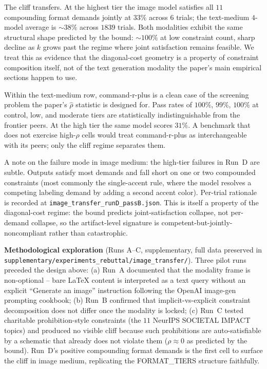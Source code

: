 \documentclass{article}
\theoremstyle{plain}
\theoremstyle{definition}
\theoremstyle{remark}
\newcommand{\rhohat}{\hat{\rho}}
\begin{document}
The cliff transfers. At the highest tier the image model satisfies all $11$ compounding format demands jointly at $33\%$ across $6$ trials; the text-medium $4$-model average is $\sim 38\%$ across $1839$ trials. Both modalities exhibit the same structural shape predicted by the bound: $\sim 100\%$ at low constraint count, sharp decline as $k$ grows past the regime where joint satisfaction remains feasible. We treat this as evidence that the diagonal-cost geometry is a property of constraint composition itself, not of the text generation modality the paper's main empirical sections happen to use.

Within the text-medium row, command-r-plus is a clean case of the screening problem the paper's $\rhohat$ statistic is designed for. Pass rates of $100\%$, $99\%$, $100\%$ at control, low, and moderate tiers are statistically indistinguishable from the frontier peers. At the high tier the same model scores $31\%$. A benchmark that does not exercise high-$\rho$ cells would treat command-r-plus as interchangeable with its peers; only the cliff regime separates them.

A note on the failure mode in image medium: the high-tier failures in Run~D are subtle. Outputs satisfy most demands and fall short on one or two compounded constraints (most commonly the single-accent rule, where the model resolves a competing labeling demand by adding a second accent color). Per-trial rationale is recorded at \texttt{image\_transfer\_runD\_passB.json}. This is itself a property of the diagonal-cost regime: the bound predicts joint-satisfaction collapse, not per-demand collapse, so the artifact-level signature is competent-but-jointly-noncompliant rather than catastrophic.

\textbf{Methodological exploration} (Runs A--C, supplementary, full data preserved in \texttt{supplementary/experiments\_rebuttal/image\_transfer/}). Three pilot runs preceded the design above: (a) Run~A documented that the modality frame is non-optional -- bare LaTeX content is interpreted as a text query without an explicit ``Generate an image'' instruction following the OpenAI image-gen prompting cookbook; (b) Run~B confirmed that implicit-vs-explicit constraint decomposition does not differ once the modality is locked; (c) Run~C tested charitable prohibition-style constraints (the $11$ NeurIPS SOCIETAL IMPACT topics) and produced no visible cliff because such prohibitions are auto-satisfiable by a schematic that already does not violate them ($\rho \approx 0$ as predicted by the bound). Run~D's positive compounding format demands is the first cell to surface the cliff in image medium, replicating the FORMAT\_TIERS structure faithfully.
\end{document}
